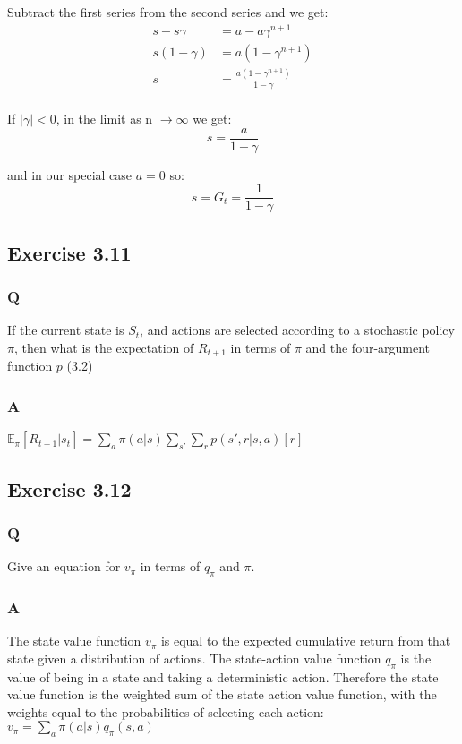 Subtract the first series from the second series and we get:
\begin{align}
s -s\gamma &= a - a\gamma^{n+1} \\
s(1 - \gamma) &= a(1 - \gamma^{n+1}) \\
s &= \frac{a(1 - \gamma^{n+1})}{1 - \gamma} \\
\end{align}

If $|\gamma| < 0$,  in the limit as n $\rightarrow \infty$ we get:
\begin{equation}
s = \frac{a}{1 - \gamma}
\end{equation}

and in our special case $a = 0$ so:
\begin{equation}
s = G_t =  \frac{1}{1 - \gamma}
\end{equation}

\subsection{Exercise 3.11}
\subsubsection*{Q}
If the current state is $S_t$, and actions are selected according to a stochastic policy \(\pi\), then what is the expectation of $R_{t+1}$ in terms of $\pi$ and the four-argument function \(p\) (3.2) 

\subsubsection*{A}
$
\mathbb{E}_\pi[R_{t+1} | s_t] = \sum_{a} \pi(a | s) \sum_{s'} \sum_{r} p(s', r | s, a) [r] 
$

\subsection{Exercise 3.12}
\subsubsection*{Q}
Give an equation for $v_\pi$ in terms of $q_\pi$ and $\pi$. 

\subsubsection*{A}
The state value function \(v_\pi\) is equal to the expected cumulative return from that state given a distribution of actions. The state-action value function \(q_\pi\) is the value of being in a state and taking a deterministic action. Therefore the state value function is the weighted sum of the state action value function, with the weights equal to the probabilities of selecting each action:
$
v_\pi = \sum_{a} \pi(a | s) q_\pi(s,a) 
$

